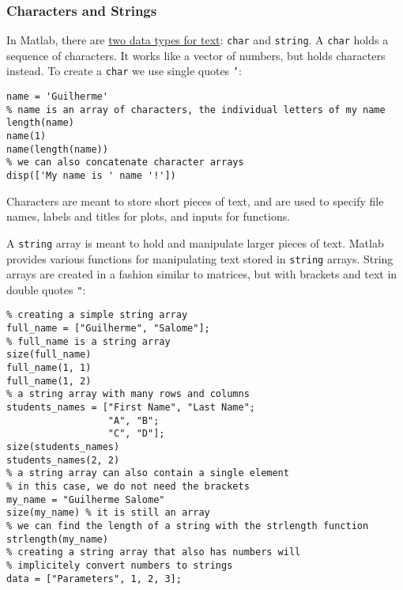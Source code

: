\documentclass[12pt, a4paper]{article}
\begin{document}
\subsubsection{Characters and Strings}
\label{sec:org5685062}
In Matlab, there are \href{https://www.mathworks.com/help/matlab/characters-and-strings.html}{two data types for text}: \texttt{char} and \texttt{string}.
A \texttt{char} holds a sequence of characters.
It works like a vector of numbers, but holds characters instead.
To create a \texttt{char} we use single quotes \texttt{'}:
\lstset{language=matlab,label= ,caption= ,captionpos=b,firstnumber=1,numbers=left,style=Matlab-editor}
\begin{lstlisting}
name = 'Guilherme'
% name is an array of characters, the individual letters of my name
length(name)
name(1)
name(length(name))
% we can also concatenate character arrays
disp(['My name is ' name '!'])
\end{lstlisting}
Characters are meant to store short pieces of text, and are used to specify file names, labels and titles for plots, and inputs for functions.

A \texttt{string} array is meant to hold and manipulate larger pieces of text.
Matlab provides various functions for manipulating text stored in \texttt{string} arrays.
String arrays are created in a fashion similar to matrices, but with brackets and text in double quotes \texttt{"}:
\lstset{language=matlab,label= ,caption= ,captionpos=b,firstnumber=1,numbers=left,style=Matlab-editor}
\begin{lstlisting}
% creating a simple string array
full_name = ["Guilherme", "Salome"];
% full_name is a string array
size(full_name)
full_name(1, 1)
full_name(1, 2)
% a string array with many rows and columns
students_names = ["First Name", "Last Name";
                  "A", "B";
                  "C", "D"];
size(students_names)
students_names(2, 2)
% a string array can also contain a single element
% in this case, we do not need the brackets
my_name = "Guilherme Salome"
size(my_name) % it is still an array
% we can find the length of a string with the strlength function
strlength(my_name)
% creating a string array that also has numbers will
% implicitely convert numbers to strings
data = ["Parameters", 1, 2, 3];
\end{lstlisting}
\end{document}
